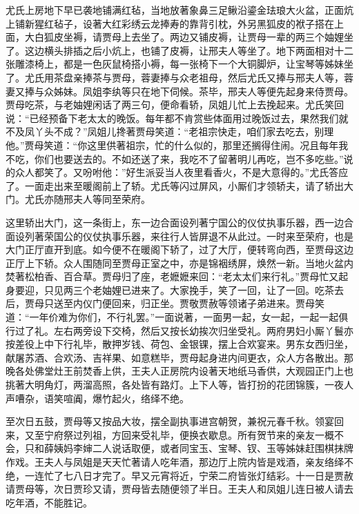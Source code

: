 \begin{parag}


    尤氏上房地下早已袭地铺满红毡，当地放著象鼻三足鳅沿鎏金珐琅大火盆，正面炕上铺新猩红毡子，设著大红彩绣云龙捧寿的靠背引枕，外另黑狐皮的袱子搭在上面，大白狐皮坐褥，请贾母上去坐了。两边又铺皮褥，让贾母一辈的两三个妯娌坐了。这边横头排插之后小炕上，也铺了皮褥，让邢夫人等坐了。地下两面相对十二张雕漆椅上，都是一色灰鼠椅搭小褥，每一张椅下一个大铜脚炉，让宝琴等姊妹坐了。尤氏用茶盘亲捧茶与贾母，蓉妻捧与众老祖母，然后尤氏又捧与邢夫人等，蓉妻又捧与众姊妹。凤姐李纨等只在地下伺候。茶毕，邢夫人等便先起身来侍贾母。贾母吃茶，与老妯娌闲话了两三句，便命看轿，凤姐儿忙上去挽起来。尤氏笑回说：“已经预备下老太太的晚饭。每年都不肯赏些体面用过晚饭过去，果然我们就不及凤丫头不成？”凤姐儿搀著贾母笑道：“老祖宗快走，咱们家去吃去，别理他。”贾母笑道：“你这里供著祖宗，忙的什么似的，那里还搁得住闹。况且每年我不吃，你们也要送去的。不如还送了来，我吃不了留著明儿再吃，岂不多吃些。”说的众人都笑了。又吩咐他：”好生派妥当人夜里看香火，不是大意得的。”尤氏答应了。一面走出来至暖阁前上了轿。尤氏等闪过屏风，小厮们才领轿夫，请了轿出大门。尤氏亦随邢夫人等同至荣府。
\end{parag}


\begin{parag}


    这里轿出大门，这一条街上，东一边合面设列著宁国公的仪仗执事乐器，西一边合面设列著荣国公的仪仗执事乐器，来往行人皆屏退不从此过。一时来至荣府，也是大门正厅直开到底。如今便不在暖阁下轿了，过了大厅，便转弯向西，至贾母这边正厅上下轿。众人围随同至贾母正室之中，亦是锦裀绣屏，焕然一新。当地火盆内焚著松柏香、百合草。贾母归了座，老嬷嬷来回：“老太太们来行礼。”贾母忙又起身要迎，只见两三个老妯娌已进来了。大家挽手，笑了一回，让了一回。吃茶去后，贾母只送至内仪门便回来，归正坐。贾敬贾赦等领诸子弟进来。贾母笑道：“一年价难为你们，不行礼罢。”一面说著，一面男一起，女一起，一起一起俱行过了礼。左右两旁设下交椅，然后又按长幼挨次归坐受礼。两府男妇小厮丫鬟亦按差役上中下行礼毕，散押岁钱、荷包、金银锞，摆上合欢宴来。男东女西归坐，献屠苏酒、合欢汤、吉祥果、如意糕毕，贾母起身进内间更衣，众人方各散出。那晚各处佛堂灶王前焚香上供，王夫人正房院内设著天地纸马香供，大观园正门上也挑著大明角灯，两溜高照，各处皆有路灯。上下人等，皆打扮的花团锦簇，一夜人声嘈杂，语笑喧阗，爆竹起火，络绎不绝。
\end{parag}


\begin{parag}


    至次日五鼓，贾母等又按品大妆，摆全副执事进宫朝贺，兼祝元春千秋。领宴回来，又至宁府祭过列祖，方回来受礼毕，便换衣歇息。所有贺节来的亲友一概不会，只和薛姨妈李婶二人说话取便，或者同宝玉、宝琴、钗、玉等姊妹赶围棋抹牌作戏。王夫人与凤姐是天天忙著请人吃年酒，那边厅上院内皆是戏酒，亲友络绎不绝，一连忙了七八日才完了。早又元宵将近，宁荣二府皆张灯结彩。十一日是贾赦请贾母等，次日贾珍又请，贾母皆去随便领了半日。王夫人和凤姐儿连日被人请去吃年酒，不能胜记。
\end{parag}


